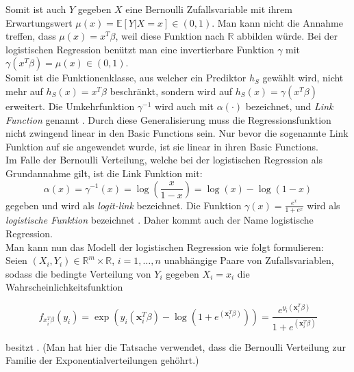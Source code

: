 Somit ist auch $Y$ gegeben $X$ eine Bernoulli Zufallsvariable mit ihrem Erwartungswert $\mu(x) = \mathbb{E}[Y|X = x] \in (0,1)$. Man kann nicht die Annahme treffen, dass 
$\mu(x) = x^T\beta$, weil diese Funktion nach $\mathbb{R}$ abbilden w\"urde. Bei der logistischen Regression ben\"utzt man eine invertierbare Funktion $\gamma$ mit 
$\gamma(x^T\beta) = \mu(x) \in (0,1)$. \\

Somit ist die Funktionenklasse, aus welcher ein Prediktor $h_S$ gew\"ahlt wird, nicht mehr auf $h_S(x) = x^T\beta$ beschr\"ankt, 
sondern wird auf  $h_S(x) = \gamma(x^T\beta)$ erweitert. Die Umkehrfunktion $\gamma^{-1}$ wird auch mit $\alpha(\cdot)$ bezeichnet, 
und \textit{Link Function} genannt \cite{wasserman}. Durch diese Generalisierung muss die Regressionsfunktion nicht zwingend linear in den Basic Functions sein. 
Nur bevor die sogenannte Link Funktion auf sie angewendet wurde, ist sie linear in ihren Basic Functions. \\ 

Im Falle der Bernoulli Verteilung, welche bei der logistischen Regression als Grundannahme gilt, ist die Link Funktion mit:
$$ \alpha(x) = \gamma^{-1}(x) = \log(\frac{x}{1-x}) = \log(x) - \log(1-x) $$
gegeben und wird als \textit{logit-link} bezeichnet. Die Funktion $\gamma(x) = \frac{e^x}{1 + e^x}$ wird als \textit{logistische Funktion} bezeichnet \cite{wasserman}. 
Daher kommt auch der Name \glqq logistische Regression\grqq{}. \\


Man kann nun das Modell der logistischen Regression wie folgt formulieren: \\
Seien $(X_i, Y_i) \in \mathbb{R}^m \times \mathbb{R}$, $i = 1, \dots , n$  unabh\"angige Paare von Zufallsvariablen, sodass die bedingte Verteilung von 
$Y_i$ gegeben $X_i = x_i$ die Wahrscheinlichkeitsfunktion 

$$ f_{x_i^T\beta}(y_i) = \exp( y_i(\mathbf{x}_i^T\beta) - \log(1 + e^{(\mathbf{x}_i^T\beta)})) = \frac{e^{y_i(\mathbf{x}_i^T\beta)}}{1 + e^{(\mathbf{x}_i^T\beta)}}$$

besitzt \cite{wasserman}. (Man hat hier die Tatsache verwendet, dass die Bernoulli Verteilung zur Familie der Exponentialverteilungen geh\"ohrt.) \\ 


